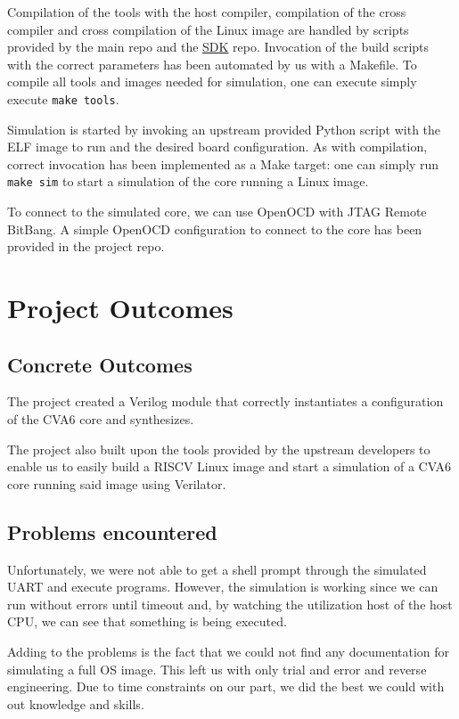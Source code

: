 \documentclass[a4paper,11pt]{article}
\begin{document}
Compilation of the tools with the host compiler, compilation of the cross
compiler and cross compilation of the Linux image are handled by scripts
provided by the main repo and the
\href{https://github.com/openhwgroup/cva6-sdk}{SDK} repo. Invocation of the
build scripts with the correct parameters has been automated by us with a
Makefile. To compile all tools and images needed for simulation, one can execute
simply execute \texttt{make tools}.

Simulation is started by invoking an upstream provided Python script with the
ELF image to run and the desired board configuration. As with compilation,
correct invocation has been implemented as a Make target: one can simply run
\texttt{make sim} to start a simulation of the core running a Linux image.

To connect to the simulated core, we can use OpenOCD with JTAG Remote BitBang.
A simple OpenOCD configuration to connect to the core has been provided in the
project repo.

\section{Project Outcomes}

\subsection{Concrete Outcomes}

The project created a Verilog module that correctly instantiates a configuration
of the CVA6 core and synthesizes.

The project also built upon the tools provided by the upstream developers to
enable us to easily build a RISCV Linux image and start a simulation of a CVA6
core running said image using Verilator.

\subsection{Problems encountered}

Unfortunately, we were not able to get a shell prompt through the simulated UART
and execute programs. However, the simulation is working since we can run
without errors until timeout and, by watching the utilization host of the host
CPU, we can see that something is being executed.

Adding to the problems is the fact that we could not find any documentation for
simulating a full OS image. This left us with only trial and error and reverse
engineering. Due to time constraints on our part, we did the best we could with
out knowledge and skills.
\end{document}
